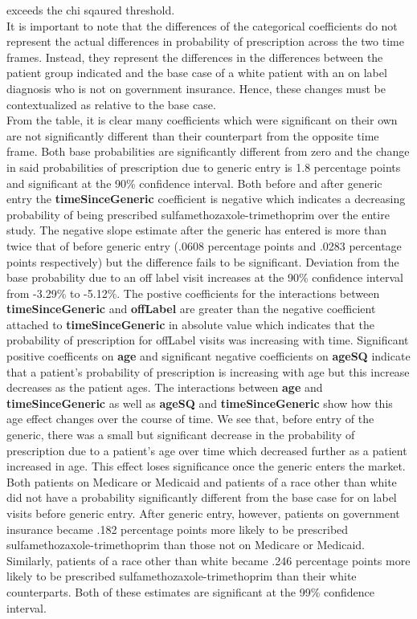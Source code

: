 exceeds the chi sqaured threshold.\\
\indent It is important to note that the differences of the categorical coefficients do not represent the actual differences in probability of prescription across the two time frames. Instead, they represent the differences in the differences between the patient group indicated and the base case of a white patient with an on label diagnosis who is not on government insurance. Hence, these changes must be contextualized as relative to the base case.\\
\indent From the table, it is clear many coefficients which were significant on their own are not significantly different than their counterpart from the opposite time frame. Both base probabilities are significantly different from zero and the change in said probabilities of prescription due to generic entry is 1.8 percentage points and significant at the 90\% confidence interval. Both before and after generic entry the \textbf{timeSinceGeneric} coefficient is negative which indicates a decreasing probability of being prescribed sulfamethozaxole-trimethoprim over the entire study. The negative slope estimate after the generic has entered is more than twice that of before generic entry (.0608 percentage points and .0283 percentage points respectively) but the difference fails to be significant. Deviation from the base probability due to an off label visit increases at the 90\% confidence interval from -3.29\% to -5.12\%. The postive coefficients for the interactions between \textbf{timeSinceGeneric} and \textbf{offLabel} are greater than the negative coefficient attached to \textbf{timeSinceGeneric} in absolute value which indicates that the probability of prescription for offLabel visits was increasing with time. Significant positive coefficents on \textbf{age} and significant negative coefficients on \textbf{ageSQ} indicate that a patient's probability of prescription is increasing with age but this increase decreases as the patient ages. The interactions between \textbf{age} and \textbf{timeSinceGeneric} as well as \textbf{ageSQ} and \textbf{timeSinceGeneric} show how this age effect changes over the course of time. We see that, before entry of the generic, there was a small but significant decrease in the probability of prescription due to a patient's age over time which decreased further as a patient increased in age. This effect loses significance once the generic enters the market.\\
\indent Both patients on Medicare or Medicaid and patients of a race other than white did not have a probability significantly different from the base case for on label visits before generic entry. After generic entry, however, patients on government insurance became .182 percentage points more likely to be prescribed sulfamethozaxole-trimethoprim than those not on Medicare or Medicaid. Similarly, patients of a race other than white became .246 percentage points more likely to be prescribed sulfamethozaxole-trimethoprim than their white counterparts. Both of these estimates are significant at the 99\% confidence interval. 


